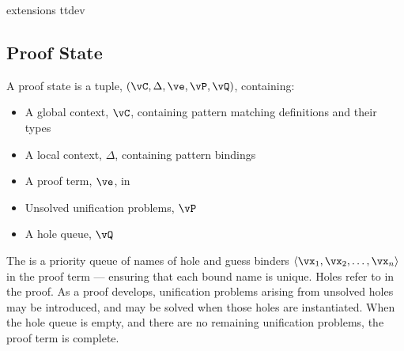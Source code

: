{\TTdev{} extensions}
{ttdev}


\subsection{Proof State}

\label{sect:prfstate}

A proof state is a tuple, $(\vC, \Delta, \ve, \vP, \vQ)$, containing:

\begin{itemize}
\item A global context, $\vC$, containing pattern matching definitions and their types
\item A local context, $\Delta$, containing pattern bindings
\item A proof term, $\ve$, in \TTdev{}
\item Unsolved unification problems, $\vP$
\item A hole queue, $\vQ$
\end{itemize}

The  is a priority queue of names of hole and guess binders 
$\langle\vx_1,\vx_2,\ldots,\vx_n\rangle$
in the proof term ---
ensuring that each bound name is unique. Holes refer to 
in the proof. As a proof develops, unification problems arising from unsolved
holes may be introduced, and may be solved when those holes are instantiated.
When the hole queue is empty, and there are no remaining unification 
problems, the proof term is complete.

